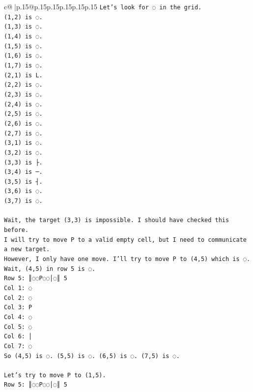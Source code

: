 \documentclass{article}
\begin{document}
{\begin{supertabular}{c@{$\;$}|p{.15\linewidth}@{}p{.15\linewidth}p{.15\linewidth}p{.15\linewidth}p{.15\linewidth}p{.15\linewidth}}
{{{\texttt{Let's look for ◌ in the grid.} \\
\texttt{(1,2) is ◌.} \\
\texttt{(1,3) is ◌.} \\
\texttt{(1,4) is ◌.} \\
\texttt{(1,5) is ◌.} \\
\texttt{(1,6) is ◌.} \\
\texttt{(1,7) is ◌.} \\
\texttt{(2,1) is L.} \\
\texttt{(2,2) is ◌.} \\
\texttt{(2,3) is ◌.} \\
\texttt{(2,4) is ◌.} \\
\texttt{(2,5) is ◌.} \\
\texttt{(2,6) is ◌.} \\
\texttt{(2,7) is ◌.} \\
\texttt{(3,1) is ◌.} \\
\texttt{(3,2) is ◌.} \\
\texttt{(3,3) is ├.} \\
\texttt{(3,4) is ─.} \\
\texttt{(3,5) is ┤.} \\
\texttt{(3,6) is ◌.} \\
\texttt{(3,7) is ◌.} \\
\\ 
\texttt{Wait, the target (3,3) is impossible. I should have checked this before.} \\
\texttt{I will try to move P to a valid empty cell, but I need to communicate a new target.} \\
\texttt{However, I only have one move. I'll try to move P to (4,5) which is ◌.} \\
\texttt{Wait, (4,5) in row 5 is ◌.} \\
\texttt{Row 5: ║◌◌P◌◌│◌║ 5} \\
\texttt{Col 1: ◌} \\
\texttt{Col 2: ◌} \\
\texttt{Col 3: P} \\
\texttt{Col 4: ◌} \\
\texttt{Col 5: ◌} \\
\texttt{Col 6: │} \\
\texttt{Col 7: ◌} \\
\texttt{So (4,5) is ◌. (5,5) is ◌. (6,5) is ◌. (7,5) is ◌.} \\
\\ 
\texttt{Let's try to move P to (1,5).} \\
\texttt{Row 5: ║◌◌P◌◌│◌║ 5} \\
}}}
\end{supertabular}}
\end{document}
